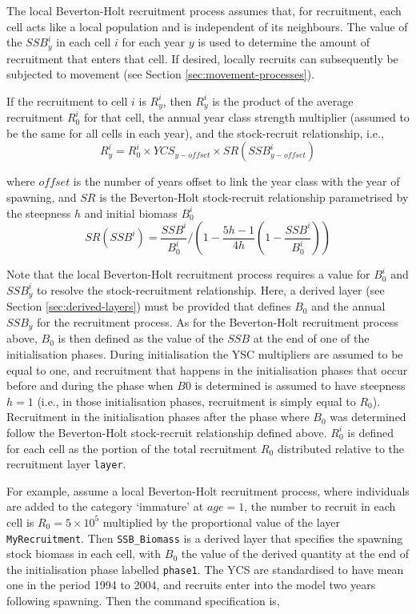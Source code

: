 The local Beverton-Holt recruitment process assumes that, for recruitment, each cell acts like a local population and is independent of its neighbours. The value of the $SSB_y^i$ in each cell $i$ for each year $y$ is used to determine the amount of recruitment that enters that cell. If desired, locally recruits can subsequently be subjected to movement (see Section \ref{sec:movement-processes}).

If the recruitment to cell $i$ is $R_y^i$, then $R_y^i$ is the product of the average recruitment $R_0^i$ for that cell, the annual year class strength multiplier (assumed to be the same for all cells in each year), and the stock-recruit relationship, i.e., 
\begin{equation}
  R_y^i = R_0^i \times YCS_{y-offset} \times SR(SSB_{y-offset}^i)
\end{equation}

where $offset$ is the number of years offset to link the year class with the year of spawning, and $SR$ is the Beverton-Holt stock-recruit relationship parametrised by the steepness $h$ and initial biomass $B_0^i$
\begin{equation}
SR(SSB^i) = \frac{SSB^i}{B_0^i} / \left( 1-\frac{5h-1}{4h} \left( 1-\frac{SSB^i}{B_0^i} \right) \right)
\end{equation}

Note that the local Beverton-Holt recruitment process requires a value for $B_0^i$ and $SSB_y^i$ to resolve the stock-recruitment relationship. Here, a derived layer (see Section \ref{sec:derived-layers}) must be provided that defines $B_0$ and the annual $SSB_y$ for the recruitment process. As for the Beverton-Holt recruitment process above, $B_0$ is then defined as the value of the $SSB$ at the end of one of the initialisation phases. During initialisation the YSC multipliers are assumed to be equal to one, and recruitment that happens in the initialisation phases that occur before and during the phase when $B0$ is determined is assumed to have steepness $h=1$ (i.e., in those initialisation phases, recruitment is simply equal to $R_0$). Recruitment in the initialisation phases after the phase where $B_0$ was determined follow the Beverton-Holt stock-recruit relationship defined above. $R_0^i$ is defined for each cell as the portion of the total recruitment $R_0$ distributed relative to the recruitment layer \texttt{layer}.

For example, assume a local Beverton-Holt recruitment process, where individuals are added to the category `immature' at $age=1$, the number to recruit in each cell is $R_0=5 \times 10^5$ multiplied by the proportional value of the layer \texttt{MyRecruitment}. Then \texttt{SSB\_Biomass} is a derived layer that specifies the spawning stock biomass in each cell, with $B_0$ the value of the derived quantity at the end of the initialisation phase labelled \texttt{phase1}. The YCS are standardised to have mean one in the period 1994 to 2004, and recruits enter into the model two years following spawning. Then the command specification is,

